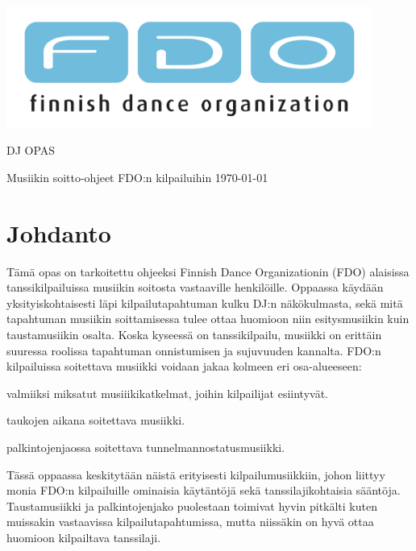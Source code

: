 \documentclass[12pt, a4paper, oneside]{article}
\begin{document}
\begin{titlepage}
    \centering
    \includegraphics[width=12cm]{FDO-logo-fix.pdf}

    \vspace{1cm}

    \bfseries
    {\Huge \blackfont DJ OPAS \par}
    {\Large Musiikin soitto-ohjeet FDO:n kilpailuihin}
    \vfill
    \large
    \today
\end{titlepage}

\cleardoublepage
\doublespacing
{}
\tableofcontents
\clearpage
\onehalfspacing

\section{Johdanto} \label{johdanto}

Tämä opas on tarkoitettu ohjeeksi Finnish Dance Organizationin (FDO) alaisissa tanssikilpailuissa musiikin soitosta vastaaville henkilöille. Oppaassa käydään yksityiskohtaisesti läpi kilpailutapahtuman kulku DJ:n näkökulmasta, sekä mitä tapahtuman musiikin soittamisessa tulee ottaa huomioon niin esitysmusiikin kuin taustamusiikin osalta. Koska kyseessä on tanssikilpailu, musiikki on erittäin suuressa roolissa tapahtuman onnistumisen ja sujuvuuden kannalta. FDO:n kilpailuissa soitettava musiikki voidaan jakaa kolmeen eri osa-alueeseen:
\begin{description}[nosep, labelindent=0.75cm]
    \item [Kilpailumusiikki:] valmiiksi miksatut musiiikikatkelmat, joihin kilpailijat esiintyvät.
    \item [Taustamusiikki:] taukojen aikana soitettava musiikki.
    \item [Palkintomusiikki:] palkintojenjaossa soitettava tunnelmannostatusmusiikki.
\end{description}

Tässä oppaassa keskitytään näistä erityisesti kilpailumusiikkiin, johon liittyy monia FDO:n kilpailuille ominaisia käytäntöjä sekä tanssilajikohtaisia sääntöja. Taustamusiikki ja palkintojenjako puolestaan toimivat hyvin pitkälti kuten muissakin vastaavissa kilpailutapahtumissa, mutta niissäkin on hyvä ottaa huomioon kilpailtava tanssilaji.
\end{document}
